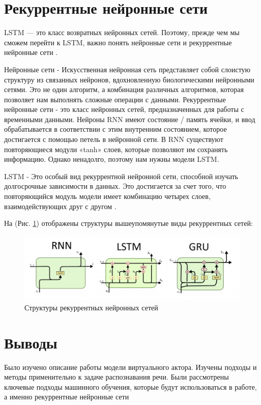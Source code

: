 \section{Рекуррентные нейронные сети}

LSTM — это класс возвратных нейронных сетей. Поэтому, прежде чем мы сможем перейти к LSTM, 
важно понять нейронные сети и рекуррентные нейронные сети \cite{Wikipedia01}. 

Нейронные сети - Искусственная нейронная сеть представляет собой слоистую структуру из связанных нейронов,
вдохновленную биологическими нейронными сетями. Это не один алгоритм, а комбинация различных алгоритмов, 
которая позволяет нам выполнять сложные операции с данными. 
Рекуррентные нейронные сети - это класс нейронных сетей, предназначенных для работы с временными данными. 
Нейроны RNN имеют состояние / память ячейки, и ввод обрабатывается в соответствии 
с этим внутренним состоянием, которое достигается с помощью петель в нейронной сети. 
В RNN существуют повторяющиеся модули «tanh» слоев, которые позволяют им сохранять информацию. 
Однако ненадолго, поэтому нам нужны модели LSTM. 

LSTM - Это особый вид рекуррентной нейронной сети, способной изучать долгосрочные зависимости в данных. 
Это достигается за счет того, что повторяющийся модуль модели имеет комбинацию четырех слоев, взаимодействующих друг с другом \cite{Wikipedia01}. 

На (Рис. \ref{pic:ris9}) отображены структуры вышеупомянутые виды рекуррентных сетей: 

\begin{figure}[h]
\includegraphics[width=0.75\columnwidth]{./img/ris9.png}
\centering
\caption{Структуры рекуррентных нейронных сетей}
\label{pic:ris9}
\end{figure}

\section{Выводы}


Было изучено описание работы модели виртуального актора. Изучены подходы и методы применительно к задаче распознавания речи.
Были рассмотрены ключевые подходы машинного обучения, которые будут использоваться в работе, а именно рекуррентные нейронные сети

